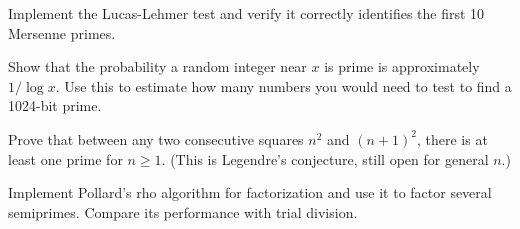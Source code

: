 \begin{exercise}
Implement the Lucas-Lehmer test and verify it correctly identifies the first 10 Mersenne primes.
\end{exercise}

\begin{exercise}
Show that the probability a random integer near $x$ is prime is approximately $1/\log x$. Use this to estimate how many numbers you would need to test to find a 1024-bit prime.
\end{exercise}

\begin{exercise}
Prove that between any two consecutive squares $n^2$ and $(n+1)^2$, there is at least one prime for $n \geq 1$. (This is Legendre's conjecture, still open for general $n$.)
\end{exercise}

\begin{exercise}[Computational]
Implement Pollard's rho algorithm for factorization and use it to factor several semiprimes. Compare its performance with trial division.
\end{exercise}
